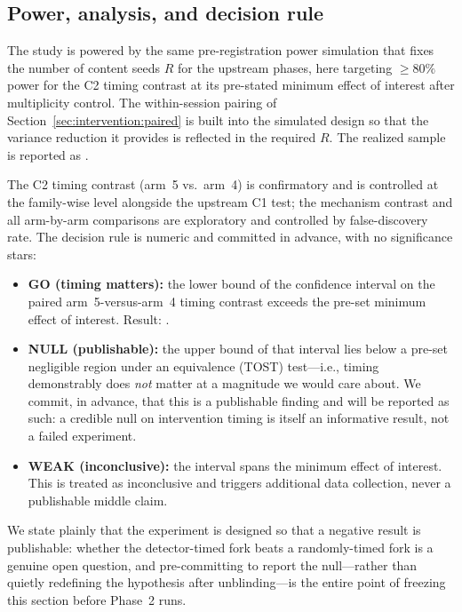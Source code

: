 \subsection{Power, analysis, and decision rule}
\label{sec:intervention:power}

The study is powered by the same pre-registration power simulation that fixes
the number of content seeds $R$ for the upstream phases, here targeting
$\geq 80\%$ power for the C2 timing contrast at its pre-stated minimum effect of
interest after multiplicity control. The within-session pairing of
Section~\ref{sec:intervention:paired} is built into the simulated design so that
the variance reduction it provides is reflected in the required $R$. The
realized sample is reported as .

The C2 timing contrast (arm~5 vs.\ arm~4) is confirmatory and is controlled at
the family-wise level alongside the upstream C1 test; the mechanism contrast and
all arm-by-arm comparisons are exploratory and controlled by false-discovery
rate. The decision rule is numeric and committed in advance, with no
significance stars:

\begin{itemize}
  \item \textbf{GO (timing matters):} the lower bound of the confidence interval
        on the paired arm~5-versus-arm~4 timing contrast exceeds the pre-set
        minimum effect of interest. Result: .
  \item \textbf{NULL (publishable):} the upper bound of that interval lies below
        a pre-set negligible region under an equivalence (TOST) test---i.e.,
        timing demonstrably does \emph{not} matter at a magnitude we would care
        about. We commit, in advance, that this is a publishable finding and
        will be reported as such: a credible null on intervention timing is
        itself an informative result, not a failed experiment.
  \item \textbf{WEAK (inconclusive):} the interval spans the minimum effect of
        interest. This is treated as inconclusive and triggers additional data
        collection, never a publishable middle claim.
\end{itemize}

We state plainly that the experiment is designed so that a negative result is
publishable: whether the detector-timed fork beats a randomly-timed fork is a
genuine open question, and pre-committing to report the null---rather than
quietly redefining the hypothesis after unblinding---is the entire point of
freezing this section before Phase~2 runs.

